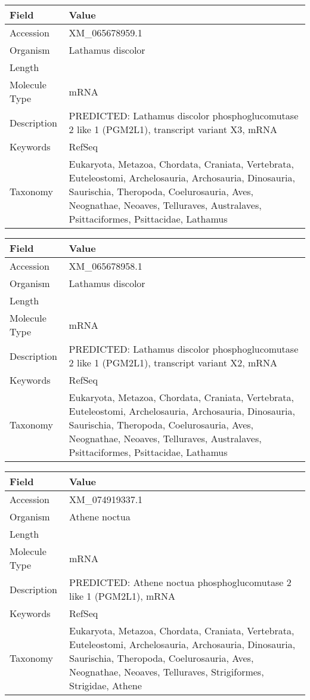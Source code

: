 \documentclass[10pt]{article}
\begin{document}
{\footnotesize
\begin{longtable}{>{\raggedright\arraybackslash}p{4.5cm} >{\raggedright\arraybackslash}p{11.5cm}}
\textbf{Field} & \textbf{Value} \\
\hline
Accession & XM\_065678959.1 \\
Organism & Lathamus discolor \\
Length & 2221 \\
Molecule Type & mRNA \\
Description & PREDICTED: Lathamus discolor phosphoglucomutase 2 like 1 (PGM2L1), transcript variant X3, mRNA \\
Keywords & RefSeq \\
Taxonomy & Eukaryota, Metazoa, Chordata, Craniata, Vertebrata, Euteleostomi, Archelosauria, Archosauria, Dinosauria, Saurischia, Theropoda, Coelurosauria, Aves, Neognathae, Neoaves, Telluraves, Australaves, Psittaciformes, Psittacidae, Lathamus \\
\end{longtable}
}

{\footnotesize
\begin{longtable}{>{\raggedright\arraybackslash}p{4.5cm} >{\raggedright\arraybackslash}p{11.5cm}}
\textbf{Field} & \textbf{Value} \\
\hline
Accession & XM\_065678958.1 \\
Organism & Lathamus discolor \\
Length & 6310 \\
Molecule Type & mRNA \\
Description & PREDICTED: Lathamus discolor phosphoglucomutase 2 like 1 (PGM2L1), transcript variant X2, mRNA \\
Keywords & RefSeq \\
Taxonomy & Eukaryota, Metazoa, Chordata, Craniata, Vertebrata, Euteleostomi, Archelosauria, Archosauria, Dinosauria, Saurischia, Theropoda, Coelurosauria, Aves, Neognathae, Neoaves, Telluraves, Australaves, Psittaciformes, Psittacidae, Lathamus \\
\end{longtable}
}

{\footnotesize
\begin{longtable}{>{\raggedright\arraybackslash}p{4.5cm} >{\raggedright\arraybackslash}p{11.5cm}}
\textbf{Field} & \textbf{Value} \\
\hline
Accession & XM\_074919337.1 \\
Organism & Athene noctua \\
Length & 2966 \\
Molecule Type & mRNA \\
Description & PREDICTED: Athene noctua phosphoglucomutase 2 like 1 (PGM2L1), mRNA \\
Keywords & RefSeq \\
Taxonomy & Eukaryota, Metazoa, Chordata, Craniata, Vertebrata, Euteleostomi, Archelosauria, Archosauria, Dinosauria, Saurischia, Theropoda, Coelurosauria, Aves, Neognathae, Neoaves, Telluraves, Strigiformes, Strigidae, Athene \\
\end{longtable}
}
\end{document}
